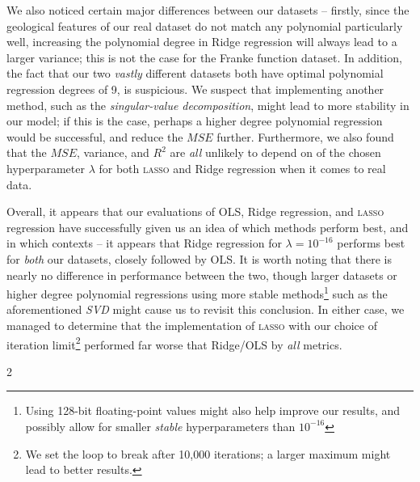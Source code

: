 \documentclass[a4paper,10pt,english]{article}
\begin{document}
\begin{multicols*}{2}
We also noticed certain major differences between our datasets – firstly, since the geological features of our real dataset do not match any polynomial particularly well, increasing the polynomial degree in Ridge regression will always lead to a larger variance; this is not the case for the Franke function dataset.  In addition, the fact that our two \textit{vastly} different datasets both have optimal polynomial regression degrees of 9, is suspicious.  We suspect that implementing another method, such as the \textit{singular-value decomposition}, might lead to more stability in our model; if this is the case, perhaps a higher degree polynomial regression would be successful, and reduce the $MSE$ further.  Furthermore, we also found that the $MSE$, variance, and $R^2$ are \textit{all} unlikely to depend on of the chosen hyperparameter $\lambda$ for both \textsc{lasso} and Ridge regression when it comes to real data.

Overall, it appears that our evaluations of OLS, Ridge regression, and \textsc{lasso} regression have successfully given us an idea of which methods perform best, and in which contexts – it appears that Ridge regression for $\lambda = 10^{-16}$ performs best for \textit{both} our datasets, closely followed by OLS.  It is worth noting that there is nearly no difference in performance between the two, though larger datasets or higher degree polynomial regressions using more stable methods\footnote{Using 128-bit floating-point values might also help improve our results, and possibly allow for smaller \textit{stable} hyperparameters than $10^{-16}$} such as the aforementioned \textit{SVD} might cause us to revisit this conclusion.  In either case, we managed to determine that the implementation of \textsc{lasso} with our choice of iteration limit\footnote{We set the loop to break after 10,000 iterations; a larger maximum might lead to better results.} performed far worse that Ridge/OLS by \textit{all} metrics.

{}

\end{multicols*}{2}
\end{document}
